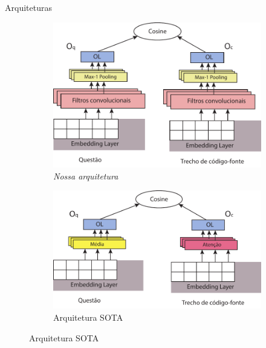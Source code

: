 \documentclass[10pt]{beamer}
\begin{document}
\begin{frame}{Arquiteturas}
        \begin{figure}
          \begin{subfigure}[h]{0.45\textwidth}
            \includegraphics[width=\textwidth]{figuras/cnn-architecture-proposal.pdf}
            \caption{\textit{Nossa arquitetura}}
            \label{fig:our-architecture}
          \end{subfigure}
          \hspace{1em}%
          \begin{subfigure}[h]{0.45\textwidth}
            \includegraphics[width=\textwidth]{figuras/unif-architecture.pdf}
            \caption{Arquitetura SOTA}
            \label{fig:unif-architecture}
          \end{subfigure}
          

\end{figure}
\end{frame}
\end{document}
